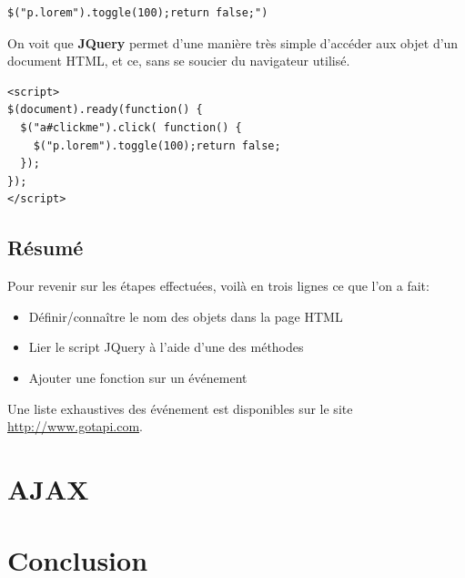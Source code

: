 \documentclass[10pt,a4paper,titlepage]{article}
\begin{document}
\begin{lstlisting}
$("p.lorem").toggle(100);return false;")
\end{lstlisting}

On voit que \textbf{JQuery} permet d'une manière très simple d'accéder aux objet d'un document HTML, et ce, sans se soucier du navigateur utilisé.

\begin{lstlisting}
<script>
$(document).ready(function() {
  $("a#clickme").click( function() {
    $("p.lorem").toggle(100);return false;
  });
});
</script>
\end{lstlisting}

\subsection{Résumé}

Pour revenir sur les étapes effectuées, voilà en trois lignes ce que l'on a fait: \\

\begin{itemize}
	\item Définir/connaître le nom des objets dans la page HTML
	\item Lier le script JQuery à l'aide d'une des méthodes
	\item Ajouter une fonction sur un événement
\end{itemize}

Une liste exhaustives des événement est disponibles sur le site \url{http://www.gotapi.com}.

\section{}


\section{AJAX}

\newpage

\newpage
\section{Conclusion}

% 
%
% 
% 
\end{document}
